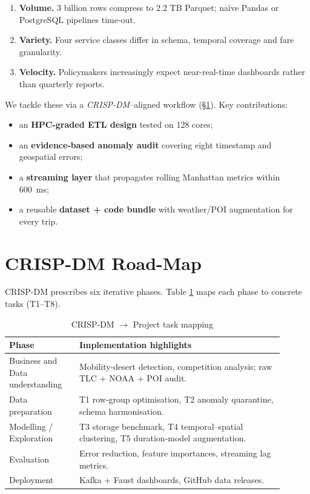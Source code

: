 \documentclass[conference]{IEEEtran}
\begin{document}
\begin{enumerate}
\item \textbf{Volume.} 3 billion rows compress to 2.2 TB Parquet; naïve
      Pandas or PostgreSQL pipelines time-out.
\item \textbf{Variety.} Four service classes differ in schema,
      temporal coverage and fare granularity.
\item \textbf{Velocity.} Policymakers increasingly expect
      near-real-time dashboards rather than quarterly reports.
\end{enumerate}

We tackle these via a \emph{CRISP-DM}–aligned workflow
(§\ref{sec:crisp}).  
Key contributions:

\begin{itemize}
\item an \textbf{HPC-graded ETL design} tested on 128 cores;
\item an \textbf{evidence-based anomaly audit}
      covering eight timestamp and geospatial errors;
\item a \textbf{streaming layer} that propagates rolling Manhattan
      metrics within \SI{600}{\milli\second};
\item a reusable \textbf{dataset + code bundle} with weather/POI
      augmentation for every trip.
\end{itemize}

\section{CRISP-DM Road-Map}\label{sec:crisp}
CRISP-DM prescribes six iterative phases.  
Table \ref{tab:crisp} maps each phase to concrete tasks (T1–T8).

\begin{table}[htbp]
\caption{CRISP-DM \(\to\) Project task mapping}
\label{tab:crisp}
\centering
\begin{tabular}{p{0.23\linewidth}p{0.67\linewidth}}
\toprule
\textbf{Phase} & \textbf{Implementation highlights} \\ \midrule
Business and Data understanding &
  Mobility-desert detection, competition analysis; raw TLC + NOAA + POI audit.\\
Data preparation &
  T1 row-group optimisation, T2 anomaly quarantine, schema harmonisation.\\
Modelling / Exploration &
  T3 storage benchmark, T4 temporal–spatial clustering,
  T5 duration-model augmentation.\\
Evaluation &
  Error reduction, feature importances,
  streaming lag metrics.\\
Deployment &
  Kafka + Faust dashboards, GitHub data releases.\\
\bottomrule
\end{tabular}
\end{table}
\end{document}
